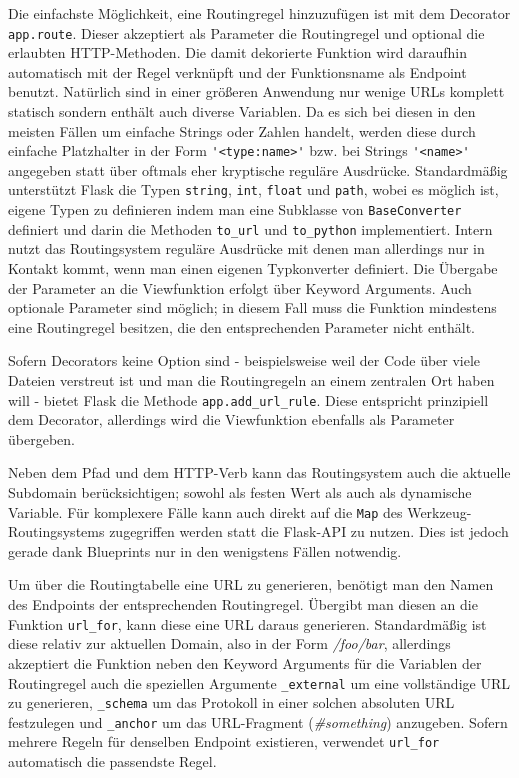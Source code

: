 \begin{description}
Die einfachste Möglichkeit, eine Routingregel hinzuzufügen ist mit dem Decorator
\lstinline{app.route}. Dieser akzeptiert als Parameter die Routingregel und optional die erlaubten
HTTP-Methoden. Die damit dekorierte Funktion wird daraufhin automatisch mit der Regel verknüpft und
der Funktionsname als Endpoint benutzt. Natürlich sind in einer größeren Anwendung nur wenige URLs
komplett statisch sondern enthält auch diverse Variablen. Da es sich bei diesen in den meisten
Fällen um einfache Strings oder Zahlen handelt, werden diese durch einfache Platzhalter in der Form
\lstinline{'<type:name>'} bzw. bei Strings \lstinline{'<name>'} angegeben statt über oftmals eher
kryptische reguläre Ausdrücke. Standardmäßig unterstützt Flask die Typen \lstinline{string},
\lstinline{int}, \lstinline{float} und \lstinline{path}, wobei es möglich ist, eigene Typen zu
definieren indem man eine Subklasse von \lstinline{BaseConverter} definiert und darin die Methoden
\lstinline{to_url} und \lstinline{to_python} implementiert. Intern nutzt das Routingsystem reguläre
Ausdrücke mit denen man allerdings nur in Kontakt kommt, wenn man einen eigenen Typkonverter
definiert. Die Übergabe der Parameter an die Viewfunktion erfolgt über Keyword Arguments. Auch
optionale Parameter sind möglich; in diesem Fall muss die Funktion mindestens eine Routingregel
besitzen, die den entsprechenden Parameter nicht enthält.

Sofern Decorators keine Option sind - beispielsweise weil der Code über viele Dateien verstreut ist
und man die Routingregeln an einem zentralen Ort haben will - bietet Flask die Methode
\lstinline{app.add_url_rule}. Diese entspricht prinzipiell dem Decorator, allerdings wird die
Viewfunktion ebenfalls als Parameter übergeben.

Neben dem Pfad und dem HTTP-Verb kann das Routingsystem auch die aktuelle Subdomain berücksichtigen;
sowohl als festen Wert als auch als dynamische Variable. Für komplexere Fälle kann auch direkt auf
die \lstinline{Map} des Werkzeug-Routingsystems zugegriffen werden statt die Flask-API zu nutzen.
Dies ist jedoch gerade dank Blueprints nur in den wenigstens Fällen notwendig.

Um über die Routingtabelle eine URL zu generieren, benötigt man den Namen des Endpoints der
entsprechenden Routingregel. Übergibt man diesen an die Funktion \lstinline{url_for}, kann diese
eine URL daraus generieren. Standardmäßig ist diese relativ zur aktuellen Domain, also in der Form
\emph{/foo/bar}, allerdings akzeptiert die Funktion neben den Keyword Arguments für die Variablen
der Routingregel auch die speziellen Argumente \lstinline{_external} um eine vollständige URL zu
generieren, \lstinline{_schema} um das Protokoll in einer solchen absoluten URL festzulegen und
\lstinline{_anchor} um das URL-Fragment (\emph{\#something}) anzugeben. Sofern mehrere Regeln für
denselben Endpoint existieren, verwendet \lstinline{url_for} automatisch die passendste Regel.


\end{description}
